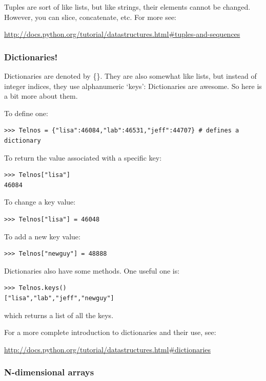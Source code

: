 \documentclass[11pt]{book}
\begin{document}
{{{{\noindent Tuples are sort of like lists, but like strings, their elements cannot be changed.  However, you can slice, concatenate, etc.
 For more see:

\url{ http://docs.python.org/tutorial/datastructures.html#tuples-and-sequences}




\subsubsection {Dictionaries!}

Dictionaries are denoted by \{\}.  They are also somewhat like lists, but instead of integer indices, they use alphanumeric `keys':
Dictionaries are awesome.  So here is a bit more about them.

\noindent
To define one:
{ \color{blue} \begin{verbatim}
>>> Telnos = {"lisa":46084,"lab":46531,"jeff":44707} # defines a dictionary
\end{verbatim}}

\noindent
To return the value associated with a specific key:
{ \color{blue} \begin{verbatim}
>>> Telnos["lisa"]
46084
\end{verbatim}}

\noindent
 To change a key value:

{ \color{blue} \begin{verbatim}
>>> Telnos["lisa"] = 46048
\end{verbatim}}


\noindent
To add a new key value:
{ \color{blue} \begin{verbatim}
>>> Telnos["newguy"] = 48888
\end{verbatim}}


\noindent
 Dictionaries also have some methods.
One useful one is:
{ \color{blue} \begin{verbatim}
>>> Telnos.keys()
["lisa","lab","jeff","newguy"]
\end{verbatim}}

\noindent
which returns a list of all the keys.

For a more complete introduction to dictionaries and their use,  see:

\url{http://docs.python.org/tutorial/datastructures.html#dictionaries}

\subsubsection{N-dimensional arrays}

}}}}
\end{document}
